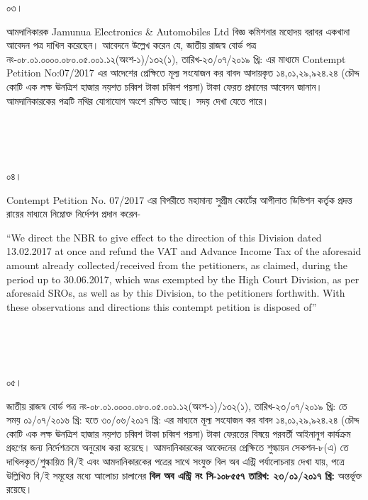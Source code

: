 \documentclass[12pt]{article}
\newcommand{\nbrl}{নং-০৮.০১.০০০০.০৮০.০৫.০০১.১২(অংশ-১)/১৩২(১), তারিখ-২৩/০৭/২০১৯ খ্রি:}
\newcommand{\tvat}{১৪,০১,২৯,৯২৪.২৪ (চৌদ্দ কোটি এক লক্ষ ঊনত্রিশ হাজার নয়শত চব্বিশ টাকা চব্বিশ পয়সা) টাকা}
\newcommand{\tl}{০১/০৭/২০১৬ খ্রি: হতে ৩০/০৬/২০১৭ খ্রি:}
\newcommand{\cno}{১০৮৫৫৭}
\newcommand{\dt}{২৩/০১/২০১৭}
\begin{document}
\begin{minipage}[t]{0.05\linewidth}
০৩।
\end{minipage}
\begin{minipage}[t]{1\linewidth}
আমদানিকারক
Jamunua Electronics \& Automobiles Ltd
বিজ্ঞ কমিশনার মহোদয় বরাবর
একখানা আবেদন পত্র দাখিল
করেছেন। আবেদনে উল্লেখ করেন যে,
জাতীয় রাজস্ব বোর্ড পত্র
{\nbrl} এর মাধ্যমে
Contempt Petition No:07/2017
এর আদেশের প্রেক্ষিতে মূল্য সংযোজন কর
বাবদ আদায়কৃত
{\tvat} ফেরত প্রদানের আবেদন জানান।
আমদানিকারকের পত্রটি নথির যোগাযোগ
অংশে রক্ষিত আছে।
সদয় দেখা যেতে পারে।
\end{minipage}
\\
\\
\\
\begin{minipage}[t]{0.05\linewidth}
০৪।
\end{minipage}
\begin{minipage}[t]{1\linewidth}
Contempt Petition No. 07/2017
এর বিপরীতে মহামান্য সুপ্রীম কোর্টের
আপীলাত ডিভিশন কর্তৃক প্রদত্ত রায়ের
মাধ্যমে নিম্নোক্ত নির্দেশন প্রদান করেন-


\hspace{1em}``We direct the NBR
to give effect to the direction
of this Division
dated 13.02.2017
at once and refund the VAT
and Advance Income Tax
of the aforesaid amount already
collected/received from the
petitioners, as claimed, during
the period up to 30.06.2017,
which was exempted by the
High Court Division, as per
aforesaid SROs, as well as by this
Division, to the  petitioners
forthwith. With these observations
and directions this contempt
petition is disposed of''
\end{minipage}
\\
\\
\\
\begin{minipage}[t]{0.05\linewidth}
০৫।
\end{minipage}
\begin{minipage}[t]{1\linewidth}
জাতীয় রাজস্ব বোর্ড পত্র
{\nbrl} তে সময়
{\tl} এর মাধ্যমে মূল্য সংযোজন কর বাবদ
{\tvat} ফেরতের বিষয়ে পরবর্তী
আইনানুগ কার্যক্রম গ্রহণের জন্য
নির্দেশক্রমে অনুরোধ করা হয়েছে।
আমদানিকারকের আবেদনের প্রেক্ষিতে শুল্কায়ন
সেকশন-৮(এ) তে দাখিলকৃত/শুল্কায়িত
বি/ই এবং আমদানিকারকের
পত্রের সাথে সংযুক্ত বিল অব এন্ট্রি
পর্যালোচনায় দেখা যায়,
পত্রে উল্লিখিত বি/ই সমূহের
মধ্যে আলোচ্য চালানের
\textbf{বিল অব এন্ট্রি নং সি-{\cno} তারিখ: {\dt} খ্রি:} অন্তর্ভূক্ত রয়েছে।
\end{minipage}
\end{document}
